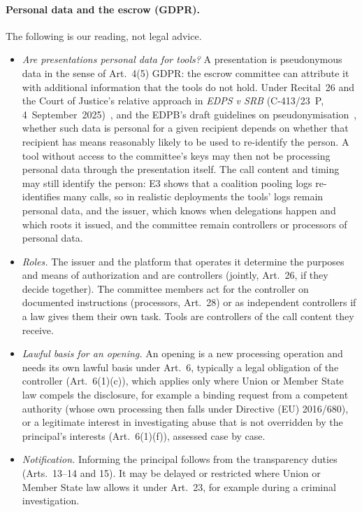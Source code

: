 \paragraph{Personal data and the escrow (GDPR).} The following is our reading, not legal advice.
\begin{itemize}[leftmargin=*]
\item \emph{Are presentations personal data for tools?} A presentation is pseudonymous data in the sense of Art.~4(5) GDPR: the escrow committee can attribute it with additional information that the tools do not hold. Under Recital~26 and the Court of Justice's relative approach in \emph{EDPS v SRB} (C-413/23~P, 4~September~2025)~\cite{cjeu2025srb}, and the EDPB's draft guidelines on pseudonymisation~\cite{edpb2025pseudo}, whether such data is personal for a given recipient depends on whether that recipient has means reasonably likely to be used to re-identify the person. A tool without access to the committee's keys may then not be processing personal data through the presentation itself. The call content and timing may still identify the person: E3 shows that a coalition pooling logs re-identifies many calls, so in realistic deployments the tools' logs remain personal data, and the issuer, which knows when delegations happen and which roots it issued, and the committee remain controllers or processors of personal data.
\item \emph{Roles.} The issuer and the platform that operates it determine the purposes and means of authorization and are controllers (jointly, Art.~26, if they decide together). The committee members act for the controller on documented instructions (processors, Art.~28) or as independent controllers if a law gives them their own task. Tools are controllers of the call content they receive.
\item \emph{Lawful basis for an opening.} An opening is a new processing operation and needs its own lawful basis under Art.~6, typically a legal obligation of the controller (Art.~6(1)(c)), which applies only where Union or Member State law compels the disclosure, for example a binding request from a competent authority (whose own processing then falls under Directive (EU) 2016/680), or a legitimate interest in investigating abuse that is not overridden by the principal's interests (Art.~6(1)(f)), assessed case by case.
\item \emph{Notification.} Informing the principal follows from the transparency duties (Arts.~13--14 and 15). It may be delayed or restricted where Union or Member State law allows it under Art.~23, for example during a criminal investigation.

\end{itemize}

